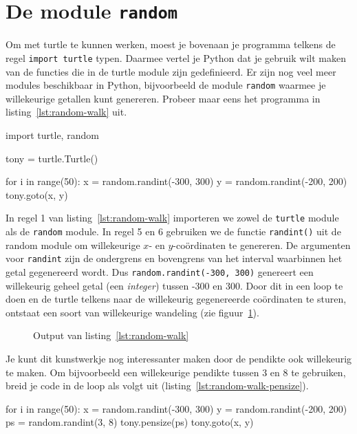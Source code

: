 \documentclass[../main]{subfiles}
\begin{document}
\section{De module \texttt{random}}%
\label{sec:random}
Om met turtle te kunnen werken, moest je bovenaan je programma telkens de regel \texttt{import turtle} typen. Daarmee vertel je Python dat je gebruik wilt maken van de functies die in de turtle module zijn gedefinieerd. Er zijn nog veel meer modules beschikbaar in Python, bijvoorbeeld de module \texttt{random} waarmee je willekeurige getallen kunt genereren. Probeer maar eens het programma in listing~\ref{lst:random-walk} uit.

\begin{python}[style=mu, caption={random\_walk.py}, label={lst:random-walk}]
import turtle, random

tony = turtle.Turtle()

for i in range(50):
    x = random.randint(-300, 300)
    y = random.randint(-200, 200)
    tony.goto(x, y)    
\end{python}

In regel 1 van listing~\ref{lst:random-walk} importeren we zowel de \texttt{turtle} module als de \texttt{random} module. In regel 5 en 6 gebruiken we de functie \texttt{randint()} uit de random module om willekeurige \(x\)- en \(y\)-coördinaten te genereren. De argumenten voor \texttt{randint} zijn de ondergrens en bovengrens van het interval waarbinnen het getal gegenereerd wordt. Dus \texttt{random.randint(-300, 300)} genereert een willekeurig geheel getal (een \emph{integer}) tussen -300 en 300. Door dit in een loop te doen en de turtle telkens naar de willekeurig gegenereerde coördinaten te sturen, ontstaat een soort van willekeurige wandeling (zie figuur~\ref{fig:turtle-random-walk}).

\begin{figure}[ht]
    \centering
    \caption{Output van listing~\ref{lst:random-walk}}%
    \label{fig:turtle-random-walk}
\end{figure}
\clearpage
Je kunt dit kunstwerkje nog interessanter maken door de pendikte ook willekeurig te maken. Om bijvoorbeeld een willekeurige pendikte tussen 3 en 8 te gebruiken, breid je code in de loop als volgt uit (listing~\ref{lst:random-walk-pensize}).

\begin{python}[style=mu, caption={Random walk met willekeurige pendikte}, label={lst:random-walk-pensize}, firstnumber=5]
for i in range(50):
    x = random.randint(-300, 300)
    y = random.randint(-200, 200)
    ps = random.randint(3, 8)
    tony.pensize(ps)
    tony.goto(x, y)    
\end{python}
\end{document}
